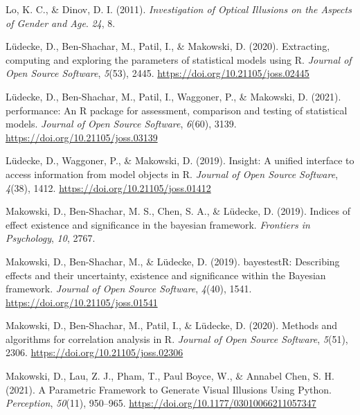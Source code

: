 \documentclass[
  man,floatsintext]{apa6}
\newlength{\cslhangindent}
\newlength{\cslentryspacingunit} %
\newenvironment{CSLReferences}[2] %
 {%
  \setlength{\parindent}{0pt}
  \ifodd #1
  \let\oldpar\par
  \def\par{\hangindent=\cslhangindent\oldpar}
  \fi
  \setlength{\parskip}{#2\cslentryspacingunit}
 }%
 {}
\begin{document}
\begin{CSLReferences}{1}{0}
\leavevmode{}%
Lo, K. C., \& Dinov, D. I. (2011). \emph{Investigation of Optical Illusions on the Aspects of Gender and Age}. \emph{24}, 8.

\leavevmode{}%
Lüdecke, D., Ben-Shachar, M., Patil, I., \& Makowski, D. (2020). Extracting, computing and exploring the parameters of statistical models using {R}. \emph{Journal of Open Source Software}, \emph{5}(53), 2445. \url{https://doi.org/10.21105/joss.02445}

\leavevmode{}%
Lüdecke, D., Ben-Shachar, M., Patil, I., Waggoner, P., \& Makowski, D. (2021). {performance}: An {R} package for assessment, comparison and testing of statistical models. \emph{Journal of Open Source Software}, \emph{6}(60), 3139. \url{https://doi.org/10.21105/joss.03139}

\leavevmode{}%
Lüdecke, D., Waggoner, P., \& Makowski, D. (2019). Insight: A unified interface to access information from model objects in {R}. \emph{Journal of Open Source Software}, \emph{4}(38), 1412. \url{https://doi.org/10.21105/joss.01412}

\leavevmode{}%
Makowski, D., Ben-Shachar, M. S., Chen, S. A., \& Lüdecke, D. (2019). Indices of effect existence and significance in the bayesian framework. \emph{Frontiers in Psychology}, \emph{10}, 2767.

\leavevmode{}%
Makowski, D., Ben-Shachar, M., \& Lüdecke, D. (2019). {bayestestR}: Describing effects and their uncertainty, existence and significance within the {Bayesian} framework. \emph{Journal of Open Source Software}, \emph{4}(40), 1541. \url{https://doi.org/10.21105/joss.01541}

\leavevmode{}%
Makowski, D., Ben-Shachar, M., Patil, I., \& Lüdecke, D. (2020). Methods and algorithms for correlation analysis in {R}. \emph{Journal of Open Source Software}, \emph{5}(51), 2306. \url{https://doi.org/10.21105/joss.02306}

\leavevmode{}%
Makowski, D., Lau, Z. J., Pham, T., Paul Boyce, W., \& Annabel Chen, S. H. (2021). A Parametric Framework to Generate Visual Illusions Using Python. \emph{Perception}, \emph{50}(11), 950--965. \url{https://doi.org/10.1177/03010066211057347}


\end{CSLReferences}
\end{document}
